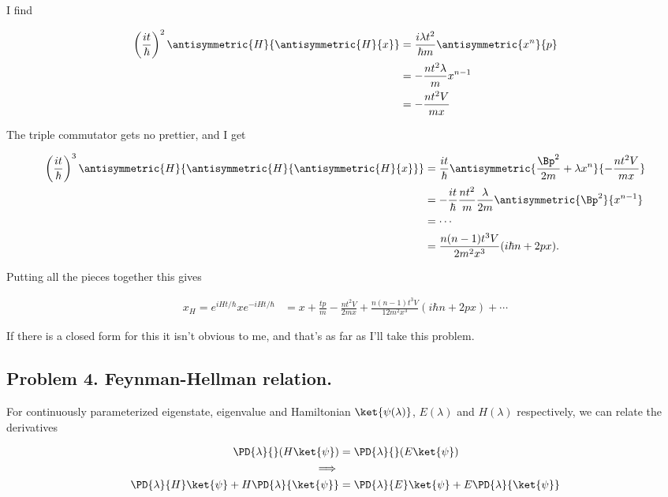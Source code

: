 I find 

\begin{align*}
\left( \frac{i t}{\hbar} \right)^2 \antisymmetric{H}{\antisymmetric{H}{x}} 
&= \frac{i \lambda t^2}{\hbar m } \antisymmetric{x^n}{p}  \\
&= - \frac{n t^2 \lambda}{m} x^{n-1} \\
&= - \frac{n t^2 V}{m x} \\
\end{align*}

The triple commutator gets no prettier, and I get

\begin{align*}
\left( \frac{i t}{\hbar} \right)^3 \antisymmetric{H}{\antisymmetric{H}{\antisymmetric{H}{x}}}
&= 
\frac{it}{\hbar} \antisymmetric{ \frac{\Bp^2}{2m} + \lambda x^n}{ - \frac{n t^2 V}{m x} } \\
&= 
-\frac{it}{\hbar} \frac{n t^2 }{m } \frac{\lambda}{2m} \antisymmetric{\Bp^2}{ x^{n-1}} \\
&= \cdots \\
&= \frac{n(n-1)t^3 V}{ 2 m^2 x^3 } (i \hbar n + 2 p x).
\end{align*}

Putting all the pieces together this gives

\begin{align}\label{eqn:desaiCh3:307}
x_H =
e^{iH t/\hbar} x e^{-iH t/\hbar}  &= 
x + \frac{tp}{m} - \frac{n t^2 V}{ 2 m x} 
+ \frac{n(n-1)t^3 V}{ 12 m^2 x^3 } (i \hbar n + 2 p x) + \cdots
\end{align}

If there is a closed form for this it isn't obvious to me, and that's as far as I'll take this problem.

\subsection{Problem 4. Feynman-Hellman relation.}

For continuously parameterized eigenstate, eigenvalue and Hamiltonian $\ket{\psi(\lambda)}$, $E(\lambda)$ and $H(\lambda)$ respectively, we can relate the derivatives

\begin{align*}
\PD{\lambda}{} ( H \ket{\psi} ) &= \PD{\lambda}{} ( E \ket{\psi} ) \\
\implies \\
\PD{\lambda}{H} \ket{\psi} +H \PD{\lambda}{\ket{\psi}} &= \PD{\lambda}{E} \ket{\psi} + E \PD{\lambda}{\ket{\psi} } 
\end{align*}

